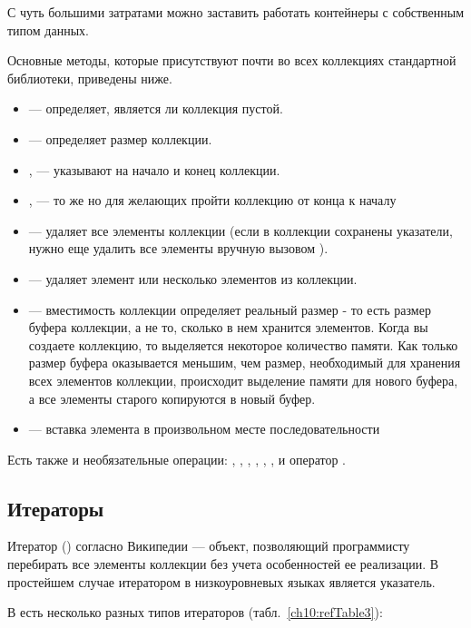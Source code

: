 
С чуть большими затратами можно заставить работать контейнеры с собственным типом данных.

Основные методы, которые присутствуют почти во всех коллекциях стандартной библиотеки, приведены ниже.

\begin{itemize}
\item {} --- определяет, является ли коллекция пустой.
\item {} --- определяет размер коллекции.
\item {},  --- указывают на начало и конец коллекции.
\item {},  --- то же но для желающих пройти коллекцию от конца к
началу
\item {} --- удаляет все элементы коллекции (если в коллекции сохранены указатели, нужно еще
удалить все элементы вручную вызовом ).
\item {} --- удаляет элемент или несколько элементов из коллекции.
\item {} --- вместимость коллекции определяет реальный размер - то есть размер буфера
коллекции, а не то, сколько в нем хранится элементов. Когда вы создаете коллекцию, то выделяется некоторое количество
памяти. Как только размер буфера оказывается меньшим, чем размер, необходимый для хранения всех элементов коллекции,
происходит выделение памяти для нового буфера, а все элементы старого копируются в новый буфер.
\item {} --- вставка элемента в произвольном месте последовательности
\end{itemize}
Есть также и необязательные операции: , ,
, , ,
, и оператор \Sys{[]}.

\subsection[Итераторы]{Итераторы}
Итератор () согласно Википедии --- объект, позволяющий программисту перебирать все элементы
коллекции без учета особенностей ее реализации. В простейшем случае итератором в низкоуровневых языках является
указатель.

В  есть несколько разных типов итераторов (табл.~\ref{ch10:refTable3}):

